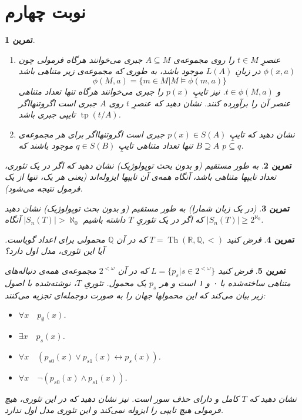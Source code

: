 \documentclass[12pt,a4paper]{report}
\theoremstyle{colorhead}
\newtheorem{tam}{تمرین}
\DeclareMathOperator{\Th}{Th}
\DeclareMathOperator{\tp}{tp}
\begin{document}
\section{نوبت چهارم}
\begin{tam}
\hfill 
\label{jabri}
\begin{enumerate}
\item 
عنصرِ
$t\in M$
را روی مجموعه‌ی
$A\subseteq M$
جبری می‌خوانند هرگاه فرمولی چون
$\phi(x,a)$
در زبانِ
$L(A)$
موجود باشد، به طوری که مجموعه‌ی زیر متناهی باشد
\[
\phi(M,a)=\{m\in M|M\models \phi(m,a)\}
\]
و 
$t\in \phi(M,a)$.
نیز تایپِ
$p(x)$
را جبری می‌خوانند هرگاه تنها تعداد متناهی عنصر آن را برآورده کنند. 
نشان دهید که عنصرِ
$t$
روی
$A$
جبری است اگروتنهااگر
$\tp(t/A)$
تایپی جبری باشد.
\item 
نشان دهید که
تایپِ
$p(x)\in S(A)$
جبری است اگروتنهااگر برای هر مجموعه‌ی
$B\supseteq A$
تنها تعداد متناهی تایپِ
$q\in S(B)$
موجود باشند که
$p\subseteq q$.
\end{enumerate}
\end{tam}
\begin{tam}
به طور مستقیم (و بدون بحث توپولوژیک) نشان دهید که اگر 
در یک تئوری،‌ تعداد تایپها متناهی باشد، آنگاه همه‌ی آن تایپها ایزوله‌اند (یعنی هر یک، تنها از یک فرمول نتیجه می‌شود).
\end{tam}
\begin{tam}
(در یک زبان شمارا)
به طور مستقیم (و بدون بحث توپولوژیک) نشان دهید که اگر در یک تئوریِ
$T$
داشته باشیم
$|S_n(T)|>\aleph_0$
آنگاه
$|S_n(T)|\geq 2^{\aleph_0}$.
\end{tam}
\begin{tam}
فرض کنید
$T=\Th(\mathbb{R},\mathbb{Q},<)$
که در آن
$\mathbb{Q}$
محمولی برای اعداد گویاست. آیا این تئوری، مدل اول دارد؟
\end{tam}
\begin{tam}
فرض کنید
$L=\{p_s|s\in 2^{<\omega}\}$
که در آن
$2^{<\omega}$
مجموعه‌ی همه‌ی دنباله‌های متناهی ساخته‌شده با
۰ و ۱ است و هر
$p_s$
یک محمول. تئوریِ
$T$،
نوشته‌شده با اصول زیر
بیان می‌کند که این محمولها جهان را به صورت دوجمله‌ای تجزیه می‌کنند:
\begin{itemize}
\item 
$\forall x\quad p_\emptyset (x)$.
\item 
$\exists x\quad p_s(x)$.
\item 
$\forall x \quad (p_{s0}(x)\vee p_{s1}(x)\leftrightarrow p_s(x))$.
\item 
$\forall x\quad \neg (p_{s0}(x)\wedge p_{s1}(x))$.
\end{itemize}
نشان دهید که 
$T$
کامل و دارای حذف سور است. نیز نشان دهید که در این تئوری، هیچ فرمولی هیچ تایپی را ایزوله نمی‌کند و این تئوری مدل اول ندارد.
\end{tam}
\end{document}
